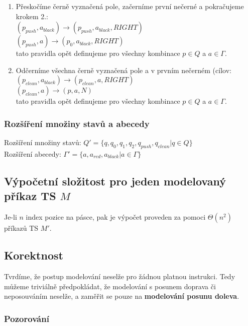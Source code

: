 \documentclass[a4paper,12pt]{article} %
\begin{document}
\begin{itemize}
\begin{enumerate}
              \item Přeskočíme černě vyznačená pole, začerníme první nečerné a pokračujeme krokem 2.:\\
                    $(p_{push}, a_{black}) \to (p_{push}, a_{black}, RIGHT)$ \\
                    $(p_{push}, a) \to (p_{0}, a_{black}, RIGHT)$\\
                    tato pravidla opět definujeme pro všechny kombinace $p \in Q$ a $a \in \Gamma$.
              \item Odčerníme všechna černě vyznačená pole a v prvním nečerném (cílov:\\
                    $(p_{clean}, a_{black}) \to (p_{clean}, a, RIGHT)$ \\
                    $(p_{clean}, a) \to (p, a, N)$\\
                    tato pravidla opět definujeme pro všechny kombinace $p \in Q$ a $a \in \Gamma$.
          \end{enumerate}
\end{itemize}

\subsubsection*{Rozšíření množiny stavů a abecedy}

Rozšíření množiny stavů: $Q' = \{q, q_0, q_1, q_2, q_{push}, q_{clean} | q \in Q\}$\\
Rozšíření abecedy: $\Gamma' = \{a, a_{red}, a_{black} | a \in \Gamma\}$

\subsection*{Výpočetní složitost pro jeden modelovaný příkaz TS $M$}

Je-li $n$ index pozice na pásce, pak je výpočet proveden za pomoci $\Theta(n^2)$ příkazů TS $M'$.

\subsection*{Korektnost}

Tvrdíme, že postup modelování neselže pro žádnou platnou instrukci. Tedy můžeme triviálně předpokládat, že modelování s posunem doprava či neposouváním neselže, a zaměřit se pouze na \textbf{modelování posunu doleva}.

\subsubsection*{Pozorování}
\end{document}
